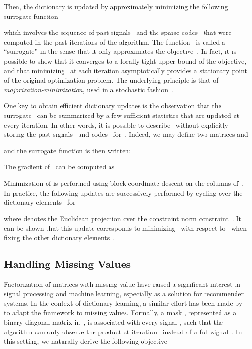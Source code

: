 \documentclass{article}
\begin{document}
Then, the dictionary is updated by approximately minimizing the following surrogate
function

which involves the sequence of past signals~ and the sparse
codes~ that were computed in the past iterations
of the algorithm.
The function~ is called a ``surrogate'' in the sense that it only
approximates the objective~.
In fact, it is possible to show that it converges to a locally tight upper-bound
of the objective, and that minimizing~ at each iteration asymptotically
provides a stationary point of the original optimization problem.
The underlying principle is that of \emph{majorization-minimization}, used
in a stochastic fashion~\citep{mairal_stochastic_2013}.

One key to obtain efficient dictionary updates is the observation that
the surrogate~ can be summarized by a few sufficient statistics that
are updated at every iteration. In other words, it is possible to
describe~ without explicitly storing the past signals~ and
codes~ for~.
Indeed, we may define two matrices  and 

and the
surrogate function is then written:

The gradient of~ can be computed as

Minimization of  is performed using block coordinate descent on the columns of~. In practice,
the following updates are successively performed by cycling over the dictionary elements~ for~

where  denotes the Euclidean projection over the constraint norm
constraint~.  It can be shown that this update corresponds to
minimizing~ with respect to~ when fixing the other dictionary
elements~\citep[see][]{mairal_online_2010}.


\subsection{Handling Missing Values} \label{subsec:masked}

Factorization of matrices with missing value have raised a significant interest in
 signal processing and machine learning, especially as a solution
for recommender systems.
In the context of dictionary learning, a similar effort has been made by~\citet{szabo_online_2011} to adapt the framework to missing
values. Formally, a mask , represented as a binary diagonal matrix in~, is
associated with every signal , such that the algorithm can only observe the product
 at iteration~ instead of a full signal~.
In this setting, we naturally derive the following objective
\end{document}
